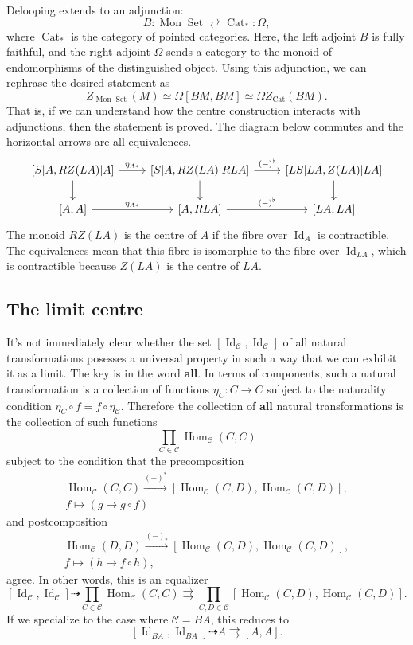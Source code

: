 \documentclass{article}
\newcommand{\C}{\mathcal{C}}
\DeclareMathOperator{\Cat}{Cat}
\DeclareMathOperator{\Hom}{Hom}
\DeclareMathOperator{\Id}{Id}
\DeclareMathOperator{\Mon}{Mon}
\DeclareMathOperator{\Set}{Set}
\theoremstyle{definition}
\begin{document}
Delooping extends to an adjunction:
\[
  B : \Mon \Set \rightleftarrows \Cat_* : \Omega,
\]
where $\Cat_*$ is the category of pointed categories.
Here, the left adjoint $B$ is fully faithful, and the right adjoint $\Omega$ sends a category to the monoid of endomorphisms of the distinguished object.
Using this adjunction, we can rephrase the desired statement as 
\[
  Z_{\Mon \Set}(M) \simeq \Omega[BM, BM] \simeq \Omega Z_{\Cat}(BM).
\]
That is, if we can understand how the centre construction interacts with adjunctions, then the statement is proved.
The diagram below commutes and the horizontal arrows are all equivalences.
\[\begin{tikzcd}
	{[S|A, RZ(LA)|A]} & {[S|A, RZ(LA)|RLA]} & {[LS | LA, Z(LA) | LA]} \\
	{[A, A]} & {[A, RLA]} & {[LA, LA]}
	\arrow["{\eta_{A\ast}}", from=1-1, to=1-2]
	\arrow[from=1-1, to=2-1]
	\arrow["{(-)^{\flat}}", from=1-2, to=1-3]
	\arrow[from=1-2, to=2-2]
	\arrow[from=1-3, to=2-3]
	\arrow["{\eta_{A\ast}}", from=2-1, to=2-2]
	\arrow["{(-)^{\flat}}", from=2-2, to=2-3]
\end{tikzcd}\]
The monoid $RZ(LA)$ is the centre of $A$ if the fibre over $\Id_A$ is contractible.
The equivalences mean that this fibre is isomorphic to the fibre over $\Id_{LA}$, which is contractible because $Z(LA)$ is the centre of $LA$.

\subsection{The limit centre}
It's not immediately clear whether the set $[\Id_{\C}, \Id_{\C}]$ of all natural transformations posesses a universal property in such a way that we can exhibit it as a limit.
The key is in the word \textbf{all}.
In terms of components, such a natural transformation is a collection of functions $\eta_C : C \to C$ subject to the naturality condition $\eta_C \circ f = f \circ \eta_\C$.
Therefore the collection of \textbf{all} natural transformations is the collection of such functions
\[ \prod_{C \in \C} \Hom_\C(C, C) \]
subject to the condition that the precomposition
\begin{gather*}
  \Hom_\C(C, C) \xrightarrow{(-)^*} [\Hom_\C(C, D), \Hom_\C(C, D)],\\
  f \mapsto (g \mapsto g \circ f)
\end{gather*}
and postcomposition
\begin{gather*}
  \Hom_\C(D, D) \xrightarrow{(-)_*} [\Hom_\C(C, D), \Hom_\C(C, D)],\\
  f \mapsto (h \mapsto f \circ h),
\end{gather*}
agree.
In other words, this is an equalizer
\[ [\Id_\C, \Id_\C] \dasharrow \prod_{C \in \C} \Hom_\C(C, C) \rightrightarrows \prod_{C, D \in \C} [\Hom_\C(C, D), \Hom_\C(C, D)]. \]
If we specialize to the case where $\C = BA$, this reduces to
\[
  [\Id_{BA}, \Id_{BA}] \dasharrow A \rightrightarrows [A, A].
\]
\end{document}
